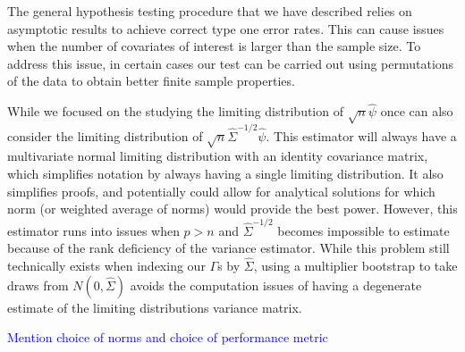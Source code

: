 \documentclass{article}
\begin{document}
The general hypothesis testing procedure that we have described relies on asymptotic results to achieve correct type one error rates.  This can cause issues when the number of covariates of interest is larger than the sample size. To address this issue, in certain cases our test can be carried out using permutations of the data to obtain better finite sample properties. 



While we focused on the studying the limiting distribution of $\sqrt{n}\hat{\psi}$ once can also consider the limiting distribution of $\sqrt{n}\hat{\Sigma}^{-1/2}\hat{\psi}$.  This estimator will always have a multivariate normal limiting distribution with an identity covariance matrix, which simplifies notation by always having a single limiting distribution.  It also simplifies proofs, and potentially could allow for analytical solutions for which norm (or weighted average of norms) would provide the best power.  However, this estimator runs into issues when $p > n$ and $\hat{\Sigma}^{-1/2}$ becomes impossible to estimate because of the rank deficiency of the variance estimator.  While this problem still technically exists when indexing our $\Gamma$s by $\hat{\Sigma}$, using a multiplier bootstrap to take draws from $N(0, \hat{\Sigma})$ avoids the computation issues of having a degenerate estimate of the limiting distributions variance matrix.

\textcolor{blue}{Mention choice of norms and choice of performance metric}

\end{document}
